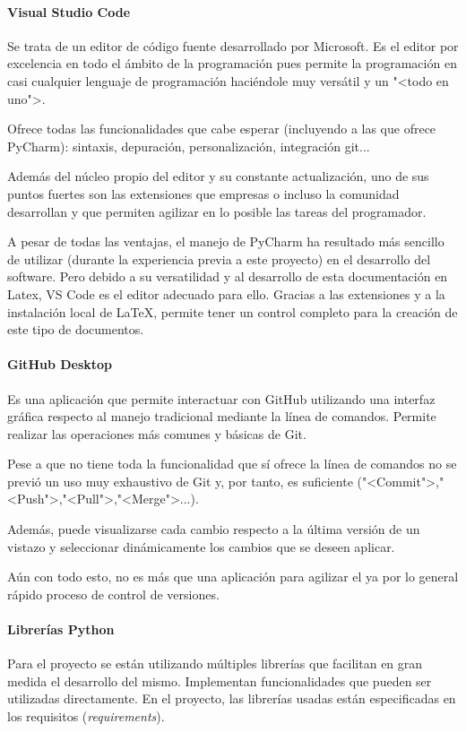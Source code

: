 \paragraph{Visual Studio Code}
Se trata de un editor de código fuente desarrollado por Microsoft. Es el editor
por excelencia en todo el ámbito de la programación pues permite la programación
en casi cualquier lenguaje de programación haciéndole muy versátil y un "<todo
en uno">.

Ofrece todas las funcionalidades que cabe esperar (incluyendo a las que ofrece
PyCharm): sintaxis, depuración, personalización, integración git...

Además del núcleo propio del editor y su constante actualización, uno de sus
puntos fuertes son las extensiones que empresas o incluso la comunidad
desarrollan y que permiten agilizar en lo posible las tareas del programador.

A pesar de todas las ventajas, el manejo de PyCharm ha resultado más sencillo de
utilizar (durante la experiencia previa a este proyecto) en el desarrollo del
software. Pero debido a su versatilidad y al desarrollo de esta
documentación en Latex, VS Code es el editor adecuado para ello. Gracias a las
extensiones y a la instalación local de \LaTeX, permite tener un control completo
para la creación de este tipo de documentos. 


\paragraph{GitHub Desktop}
Es una aplicación que permite interactuar con GitHub utilizando una interfaz
gráfica respecto al manejo tradicional mediante la línea de comandos. Permite
realizar las operaciones más comunes y básicas de Git.

Pese a que no tiene toda la funcionalidad que sí ofrece la línea de comandos no
se previó un uso muy exhaustivo de Git y, por tanto, es suficiente
("<Commit">,"<Push">,"<Pull">,"<Merge">...).

Además, puede visualizarse cada cambio respecto a la última versión de un
vistazo y seleccionar dinámicamente los cambios que se deseen aplicar.

Aún con todo esto, no es más que una aplicación para agilizar el ya por lo
general rápido proceso de control de versiones.

\paragraph{Librerías Python}
Para el proyecto se están utilizando múltiples librerías que facilitan en gran
medida el desarrollo del mismo. Implementan funcionalidades que pueden ser
utilizadas directamente. En el proyecto, las librerías usadas están
especificadas en los requisitos (\textit{requirements}).

